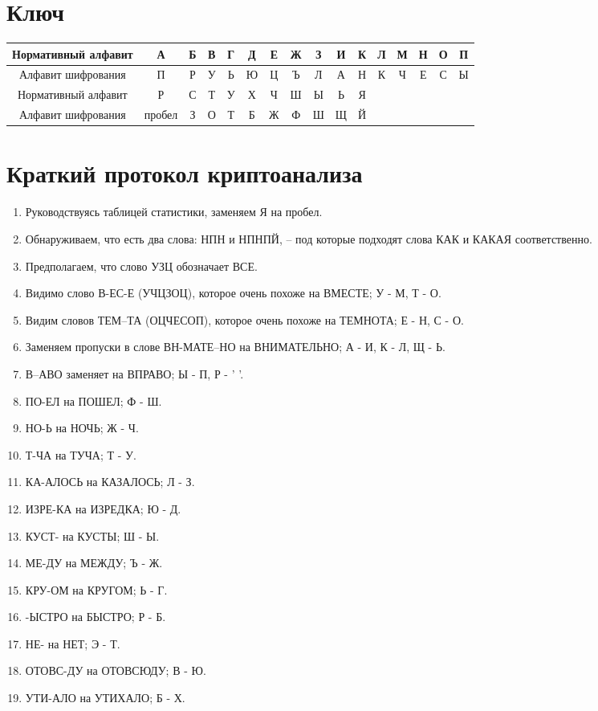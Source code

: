 \documentclass[12pt, a4paper] {ncc}
\begin{document}
\section{Ключ}
	\begin{tabular}{|c|c|c|c|c|c|c|c|c|c|c|c|c|c|c|c|}
		\hline
		Нормативный алфавит & А & Б & В & Г& Д& Е& Ж& З& И& К& Л& М& Н& О& П \\ \hline
		Алфавит шифрования  & П & Р & У & Ь& Ю& Ц& Ъ& Л& А& Н& К& Ч& Е& С& Ы \\ \hline \hline
		Нормативный алфавит & Р 	 & С& Т& У& Х& Ч& Ш& Ы& Ь& Я & & & & &\\ \hline
		Алфавит шифрования  & пробел & З& О& Т& Б& Ж& Ф& Ш& Щ& Й & & & & & \\ \hline
		
	\end{tabular}


\section{Краткий протокол криптоанализа}

	\begin{enumerate}
		\item Руководствуясь таблицей статистики, заменяем Я на пробел.
		\item Обнаруживаем, что есть два слова: НПН и НПНПЙ, -- под которые
			  подходят слова КАК и КАКАЯ соответственно.
		\item Предполагаем, что слово УЗЦ обозначает ВСЕ. 
		\item Видимо слово В-ЕС-Е (УЧЦЗОЦ), которое очень похоже на ВМЕСТЕ; У - М, Т - О.
		\item Видим словов ТЕМ--ТА (ОЦЧЕСОП), которое очень похоже на ТЕМНОТА; Е - Н, С - О.
		\item Заменяем пропуски в слове ВН-МАТЕ--НО на ВНИМАТЕЛЬНО; А - И, К - Л, Щ - Ь.
		\item В--АВО заменяет на ВПРАВО; Ы - П, Р - ' '.
		\item ПО-ЕЛ на ПОШЕЛ; Ф - Ш.
		\item НО-Ь на НОЧЬ; Ж - Ч.
		\item Т-ЧА на ТУЧА; Т - У.
		\item КА-АЛОСЬ на КАЗАЛОСЬ; Л - З.
		\item ИЗРЕ-КА на ИЗРЕДКА; Ю - Д.
		\item КУСТ- на КУСТЫ; Ш - Ы.
		\item МЕ-ДУ на МЕЖДУ; Ъ - Ж.
		\item КРУ-ОМ на КРУГОМ; Ь - Г.
		\item -ЫСТРО на БЫСТРО; Р - Б.
		\item НЕ- на НЕТ; Э - Т.
		\item ОТОВС-ДУ на ОТОВСЮДУ; В - Ю.
		\item УТИ-АЛО на УТИХАЛО; Б - Х.

	\end{enumerate}
\end{document}
